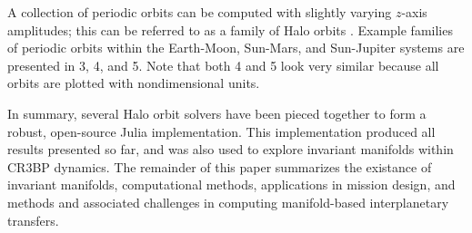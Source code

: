 \documentclass[conf]{new-aiaa}
\begin{document}
\begin{multicols}{2}
A collection of periodic orbits can be computed with slightly varying 
$z$-axis amplitudes; this can be referred to as a family of Halo orbits
\cite{rund2018interplanetary}. 
Example families of periodic orbits within the Earth-Moon, Sun-Mars, 
and Sun-Jupiter systems are presented in \figurename{3}, \figurename{4},
and \figurename{5}. Note that both \figurename{4} and \figurename{5} 
look very similar because all orbits are plotted with nondimensional units.

In summary, several Halo orbit solvers have been pieced together to form 
a robust, open-source Julia implementation. This implementation produced 
all results presented so far, and was also used to explore invariant 
manifolds within CR3BP dynamics. The remainder of this paper summarizes
the existance of invariant manifolds, computational methods, 
applications in mission design, and methods and associated challenges 
in computing manifold-based interplanetary transfers. 

\end{multicols}
\newpage
\end{document}
